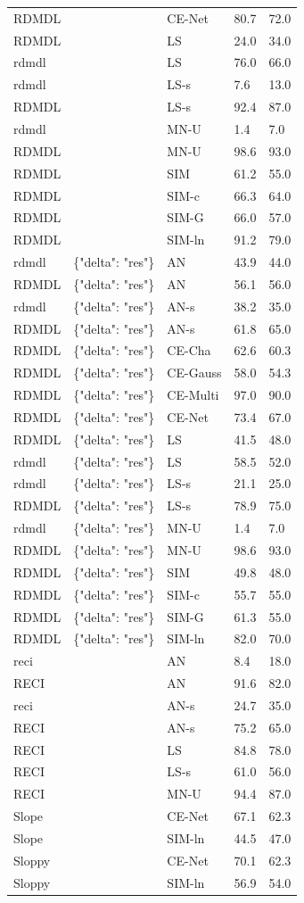 \begin{tabular}{lllll}
RDMDL &  & CE-Net & 80.7 & 72.0 \\
RDMDL &  & LS & 24.0 & 34.0 \\
rdmdl &  & LS & 76.0 & 66.0 \\
rdmdl &  & LS-s & 7.6 & 13.0 \\
RDMDL &  & LS-s & 92.4 & 87.0 \\
rdmdl &  & MN-U & 1.4 & 7.0 \\
RDMDL &  & MN-U & 98.6 & 93.0 \\
RDMDL &  & SIM & 61.2 & 55.0 \\
RDMDL &  & SIM-c & 66.3 & 64.0 \\
RDMDL &  & SIM-G & 66.0 & 57.0 \\
RDMDL &  & SIM-ln & 91.2 & 79.0 \\
rdmdl & \{"delta": "res"\} & AN & 43.9 & 44.0 \\
RDMDL & \{"delta": "res"\} & AN & 56.1 & 56.0 \\
rdmdl & \{"delta": "res"\} & AN-s & 38.2 & 35.0 \\
RDMDL & \{"delta": "res"\} & AN-s & 61.8 & 65.0 \\
RDMDL & \{"delta": "res"\} & CE-Cha & 62.6 & 60.3 \\
RDMDL & \{"delta": "res"\} & CE-Gauss & 58.0 & 54.3 \\
RDMDL & \{"delta": "res"\} & CE-Multi & 97.0 & 90.0 \\
RDMDL & \{"delta": "res"\} & CE-Net & 73.4 & 67.0 \\
RDMDL & \{"delta": "res"\} & LS & 41.5 & 48.0 \\
rdmdl & \{"delta": "res"\} & LS & 58.5 & 52.0 \\
rdmdl & \{"delta": "res"\} & LS-s & 21.1 & 25.0 \\
RDMDL & \{"delta": "res"\} & LS-s & 78.9 & 75.0 \\
rdmdl & \{"delta": "res"\} & MN-U & 1.4 & 7.0 \\
RDMDL & \{"delta": "res"\} & MN-U & 98.6 & 93.0 \\
RDMDL & \{"delta": "res"\} & SIM & 49.8 & 48.0 \\
RDMDL & \{"delta": "res"\} & SIM-c & 55.7 & 55.0 \\
RDMDL & \{"delta": "res"\} & SIM-G & 61.3 & 55.0 \\
RDMDL & \{"delta": "res"\} & SIM-ln & 82.0 & 70.0 \\
reci &  & AN & 8.4 & 18.0 \\
RECI &  & AN & 91.6 & 82.0 \\
reci &  & AN-s & 24.7 & 35.0 \\
RECI &  & AN-s & 75.2 & 65.0 \\
RECI &  & LS & 84.8 & 78.0 \\
RECI &  & LS-s & 61.0 & 56.0 \\
RECI &  & MN-U & 94.4 & 87.0 \\
Slope &  & CE-Net & 67.1 & 62.3 \\
Slope &  & SIM-ln & 44.5 & 47.0 \\
Sloppy &  & CE-Net & 70.1 & 62.3 \\
Sloppy &  & SIM-ln & 56.9 & 54.0 \\
\bottomrule
\end{tabular}
